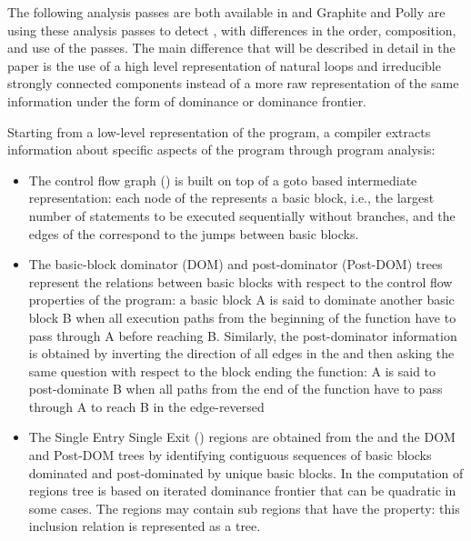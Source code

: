 \documentclass{sig-alternate}
\begin{document}
The following analysis passes are both available in \LLVM{} and 
Graphite and Polly are using these analysis passes to detect , with
differences in the order, composition, and use of the passes.  The main
difference that will be described in detail in the paper is the use of a high
level representation of natural loops and irreducible strongly connected
components instead of a more raw representation of the same information under
the form of dominance or dominance frontier.

Starting from a low-level representation of the program, a compiler extracts
information about specific aspects of the program through program analysis:

\begin{itemize}
\item The control flow graph (\CFG{}) \cite{dragonbook} is built on top of a goto
  based intermediate representation: each node of the \CFG{} represents a basic
  block, i.e., the largest number of statements to be executed sequentially
  without branches, and the edges of the \CFG{} correspond to the jumps between
  basic blocks.

\item The basic-block dominator (DOM) and post-dominator (Post-DOM) trees
  \cite{dragonbook, ramalingam} represent the relations between basic blocks with
  respect to the control flow properties of the program: a basic block A is said
  to dominate another basic block B when all execution paths from the beginning
  of the function have to pass through A before reaching B.  Similarly, the
  post-dominator information is obtained by inverting the direction of all edges
  in the \CFG{} and then asking the same question with respect to the block ending
  the function: A is said to post-dominate B when all paths from the end of the
  function have to pass through A to reach B in the edge-reversed 

\item The Single Entry Single Exit (\SESE{}) regions \cite{sese} are obtained from
  the \CFG{} and the DOM and Post-DOM trees by identifying contiguous sequences of
  basic blocks dominated and post-dominated by unique basic blocks.  In \LLVM{} the
  computation of \SESE{} regions tree is based on iterated dominance frontier
  \cite{ramalingam} that can be quadratic in some cases.  The \SESE{} regions may
  contain sub regions that have the \SESE{} property: this inclusion relation is
  represented as a tree.


\end{itemize}
\end{document}
